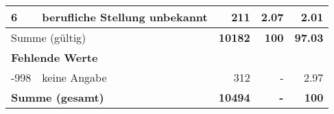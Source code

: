 \begin{longtable}{lXrrr}
     6 &
     \multicolumn{1}{X}{ berufliche Stellung unbekannt   } &


       \num{211} &
       \num[round-mode=places,round-precision=2]{2,07} &
         \num[round-mode=places,round-precision=2]{2,01} \\
     \midrule
     \multicolumn{2}{l}{Summe (gültig)} &
       \textbf{\num{10182}} &
     \textbf{100} &
       \textbf{\num[round-mode=places,round-precision=2]{97,03}} \\
     \multicolumn{5}{l}{\textbf{Fehlende Werte}}\\
       -998 &
       keine Angabe &
         \num{312} &
        - &
         \num[round-mode=places,round-precision=2]{2,97} \\
     \midrule
     \multicolumn{2}{l}{\textbf{Summe (gesamt)}} &
          \textbf{\num{10494}} &
        \textbf{-} &
        \textbf{100} \\
     \bottomrule
     \end{longtable}
     

